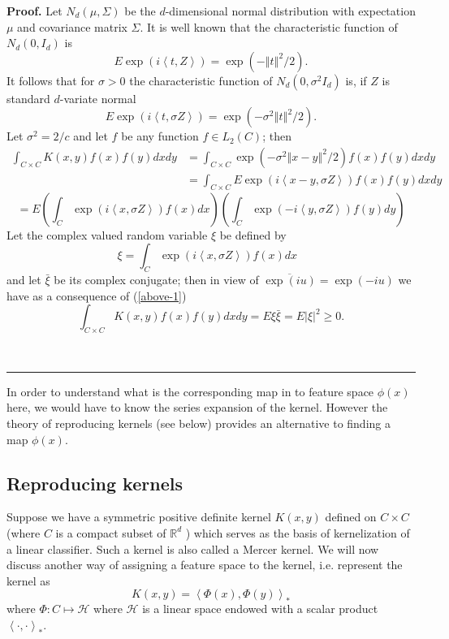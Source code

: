 \documentclass[11pt,twoside]{article}%
\theoremstyle{change}
\newenvironment{proof}[1][Proof]{\textbf{#1.} }{\ \rule{0.5em}{0.5em}}
\begin{document}
\begin{proof}
Let $N_{d}(\mu,\Sigma)$ be the $d$-dimensional normal distribution with
expectation $\mu$ and covariance matrix $\Sigma$. It is well known that the
characteristic function of $N_{d}(0,I_{d})$ is
\[
E\exp\left(  i\left\langle t,Z\right\rangle \right)  =\exp\left(  -\left\Vert
t\right\Vert ^{2}/2\right)  .
\]
It follows that for $\sigma>0$ the characteristic function of $N_{d}%
(0,\sigma^{2}I_{d})$ is, if $Z$ is standard $d$-variate normal
\[
E\exp\left(  i\left\langle t,\sigma Z\right\rangle \right)  =\exp\left(
-\sigma^{2}\left\Vert t\right\Vert ^{2}/2\right)  .
\]
Let $\sigma^{2}=2/c$ and let $f$ be any function $f\in L_{2}(C)$; then
\begin{align*}
\int_{C\times C}K(x,y)f(x)f(y)dxdy  & =\int_{C\times C}\exp\left(  -\sigma
^{2}\left\Vert x-y\right\Vert ^{2}/2\right)  f(x)f(y)dxdy\\
& =\int_{C\times C}E\exp\left(  i\left\langle x-y,\sigma Z\right\rangle
\right)  f(x)f(y)dxdy
\end{align*}%
\begin{equation}
=E\left(  \int_{C}\exp\left(  i\left\langle x,\sigma Z\right\rangle \right)
f(x)dx\right)  \left(  \int_{C}\exp\left(  -i\left\langle y,\sigma
Z\right\rangle \right)  f(y)dy\right) \label{above-1}%
\end{equation}
Let the complex valued random variable $\xi$ be defined by
\[
\xi=\int_{C}\exp\left(  i\left\langle x,\sigma Z\right\rangle \right)
f(x)dx\text{ }%
\]
and let $\bar{\xi}$ be its complex conjugate; then in view of $\overline
{\exp\left(  iu\right)  }=\exp\left(  -iu\right)  $ we have as a consequence
of (\ref{above-1})
\[
\int_{C\times C}K(x,y)f(x)f(y)dxdy=E\xi\bar{\xi}=E\left\vert \xi\right\vert
^{2}\geq0.
\]

\end{proof}

In order to understand what is the corresponding map in to feature space
$\phi(x)$ here, we would have to know the series expansion of the kernel.
However the theory of reproducing kernels (see below) provides an alternative
to finding a map $\phi(x)$.

\subsection{Reproducing kernels}

Suppose we have a symmetric positive definite kernel $K(x,y)$ defined on
$C\times C$ (where $C$ is a compact subset of $\mathbb{R}^{d}$ ) which serves
as the basis of kernelization of a linear classifier. Such a kernel is also
called a Mercer kernel. We will now discuss another way of assigning a feature
space to the kernel, i.e. represent the kernel as
\begin{equation}
K(x,y)=\left\langle \Phi(x),\Phi(y)\right\rangle _{\ast}%
\label{feature-map-def}%
\end{equation}
where $\Phi:C\mapsto\mathcal{H}$ where $\mathcal{H}$ is a linear space endowed
with a scalar product $\left\langle \cdot,\cdot\right\rangle _{\ast}$.
\end{document}
